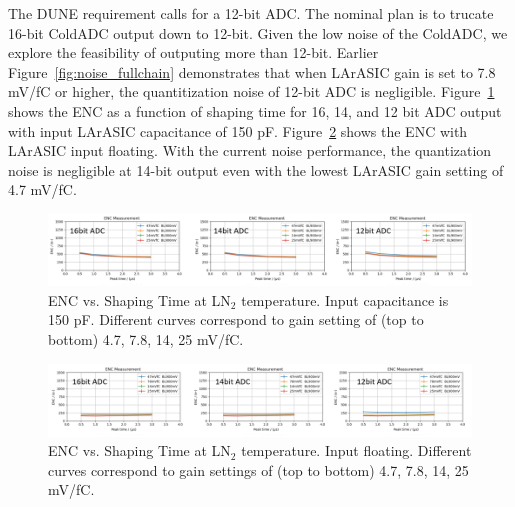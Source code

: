 The DUNE requirement calls for a 12-bit ADC. The nominal plan is to trucate 16-bit ColdADC output down to 
12-bit. Given the low noise of the ColdADC, we explore the feasibility of outputing more than 12-bit.
Earlier Figure~\ref{fig:noise_fullchain} demonstrates that when LArASIC gain is set to 7.8 mV/fC or higher, 
the quantitization noise of 12-bit ADC is negligible. Figure~\ref{fig:noise_quant150pf} 
shows the ENC as a function of shaping time for 16, 14, and 12 bit ADC output with input LArASIC capacitance
of 150 pF. Figure~\ref{fig:noise_quantfloat} shows the ENC with LArASIC input floating. With the 
current noise performance, the quantization noise is negligible at 14-bit output even with the lowest LArASIC gain setting of 4.7 mV/fC.
\begin{figure}[h!]
\centering
  \includegraphics[width=1.0\linewidth]{figures/noise_quant150pf.png}
  \caption{ENC vs. Shaping Time at LN$_2$ temperature. Input capacitance is 150 pF. Different curves 
correspond to gain setting of (top to bottom) 4.7, 7.8, 14, 25 mV/fC.}
  \label{fig:noise_quant150pf}
\end{figure}
\begin{figure}[h!]
\centering
  \includegraphics[width=1.0\linewidth]{figures/noise_quantfloat.png}
  \caption{ENC vs. Shaping Time at LN$_2$ temperature. Input floating. Different curves correspond to 
gain settings of (top to bottom) 4.7, 7.8, 14, 25 mV/fC.}
  \label{fig:noise_quantfloat}
\end{figure}



